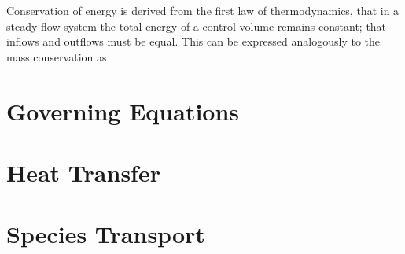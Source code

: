     Conservation of energy is derived from the first law of thermodynamics, that in a steady flow system the total energy of a control volume remains constant; that inflows and outflows must be equal. This can be expressed analogously to the mass conservation as 



\section{Governing Equations}

\section{Heat Transfer}
	
\section{Species Transport}
